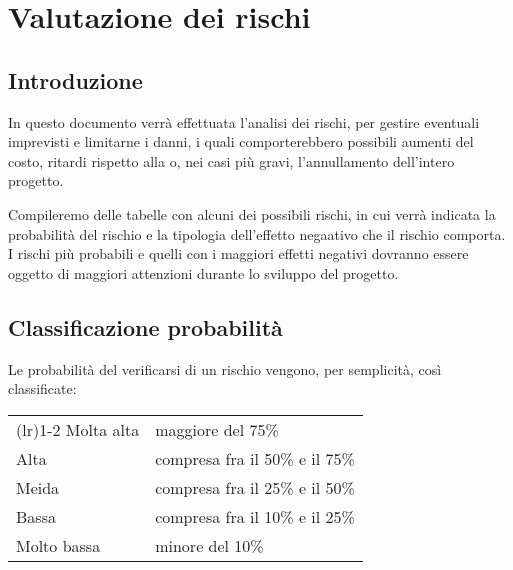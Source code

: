 \chapter{Valutazione dei rischi} 

\section{Introduzione}
In questo documento verrà effettuata l'analisi dei rischi, per gestire eventuali imprevisti e limitarne i danni, i quali comporterebbero possibili aumenti del costo, ritardi rispetto alla  o, nei casi più gravi, l'annullamento dell'intero progetto.

Compileremo delle tabelle con alcuni dei possibili rischi, in cui verrà indicata la probabilità del rischio e la tipologia dell'effetto negaativo che il rischio comporta. I rischi più probabili e quelli con i maggiori effetti negativi dovranno essere oggetto di maggiori attenzioni durante lo sviluppo del progetto.

\section{Classificazione probabilità}
Le probabilità del verificarsi di un rischio vengono, per semplicità, così classificate:
\begin{center}
	\begin{tabularx}{\widthTab}{ l  X } 
		\toprule
			\formattaTitoloTab{Classificazione} & \formattaTitoloTab{Probabilità} \\
		\cmidrule(l{\cmidrulekern}r{\cmidrulekern}){1-2}
			Molta alta & maggiore del 75\% \\ 
			\addlinespace[1em] 
			Alta & compresa fra il 50\% e il 75\%  \\ 
			\addlinespace[1em] 
			Meida & compresa fra il 25\% e il 50\%  \\ 
			\addlinespace[1em] 
			Bassa & compresa fra il 10\% e il 25\%  \\ 
			\addlinespace[1em] 
			Molto bassa & minore del 10\% \\ 
		\bottomrule
	\end{tabularx}
\end{center}

